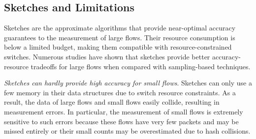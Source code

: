 


\subsection{Sketches and Limitations}\label{sketches}

Sketches are the approximate algorithms that provide near-optimal accuracy guarantees to the measurement of large flows. Their resource consumption is below a limited budget, making them compatible with resource-constrained switches. Numerous studies \cite{li2016flowradar,yang2018elastic,huang2017sketchvisor,huang2018sketchlearn,liu2016one,huang2021toward,liu2019nitrosketch,zhang2021cocosketch,namkung2022sketchlib} have shown that sketches provide better accuracy-resource tradeoffs for large flows when compared with sampling-based techniques.

 \emph{Sketches can hardly provide high accuracy for small flows}. Sketches can only use a few memory in their data structures due to switch resource constraints. As a result, the data of large flows and small flows easily collide, resulting in measurement errors. In particular, the measurement of small flows is extremely sensitive to such errors because these flows have very few packets and may be missed entirely or their small counts may be overestimated due to hash collisions. 

